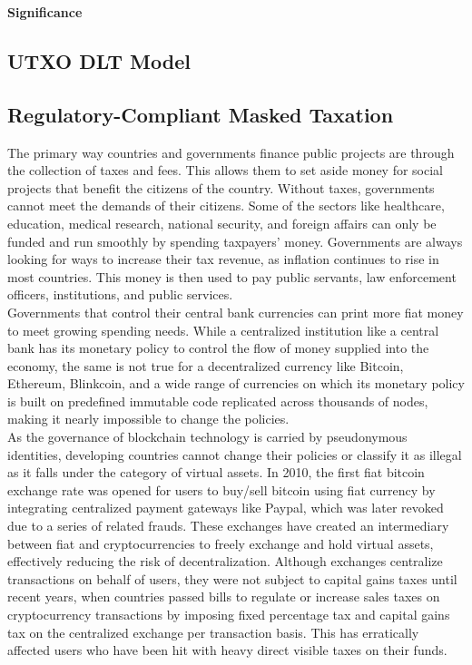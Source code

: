 \documentclass[letterpaper,11pt]{article}
\begin{document}
\textbf{Significance}\\


 



	
\subsection{UTXO DLT Model}


\subsection{Regulatory-Compliant Masked Taxation}

The primary way countries and governments finance public projects are through the collection of taxes and fees. This allows them to set aside money for social projects that benefit the citizens of the country. Without taxes, governments cannot meet the demands of their citizens. Some of the sectors like healthcare, education, medical research, national security, and foreign affairs can only be funded and run smoothly by spending taxpayers' money. Governments are always looking for ways to increase their tax revenue, as inflation continues to rise in most countries. This money is then used to pay public servants, law enforcement officers, institutions, and public services.\\

Governments that control their central bank currencies can print more fiat money to meet growing spending needs. While a centralized institution like a central bank has its monetary policy to control the flow of money supplied into the economy,  the same is not true for a decentralized currency like Bitcoin, Ethereum, Blinkcoin, and a wide range of currencies on which its monetary policy is built on predefined immutable code replicated across thousands of nodes, making it nearly impossible to change the policies.\\

As the governance of blockchain technology is carried by pseudonymous identities, developing countries cannot change their policies or classify it as illegal as it falls under the category of virtual assets. In 2010, the first fiat bitcoin exchange rate was opened for users to buy/sell bitcoin using fiat currency by integrating centralized payment gateways like Paypal, which was later revoked due to a series of related frauds. These exchanges have created an intermediary between fiat and cryptocurrencies to freely exchange and hold virtual assets, effectively reducing the risk of decentralization. Although exchanges centralize transactions on behalf of users, they were not subject to capital gains taxes until recent years, when countries passed bills to regulate or increase sales taxes on cryptocurrency transactions by imposing fixed percentage tax and capital gains tax on the centralized exchange per transaction basis. This has erratically affected users who have been hit with heavy direct visible taxes on their funds.\\
\end{document}
